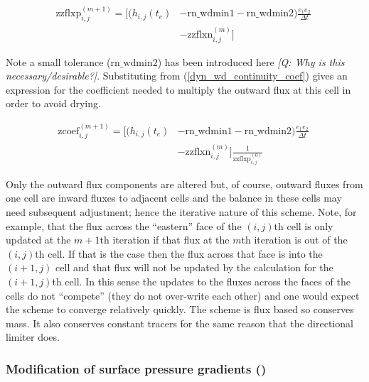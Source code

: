 \documentclass[../main/NEMO_manual]{subfiles}
\begin{document}
\begin{equation} \label{dyn_wd_max_flux}
\begin{split}
\mathrm{zzflxp}^{(m+1)}_{i,j} = \Big[ (h_{i,j}(t_e) & - \mathrm{rn\_wdmin1} - \mathrm{rn\_wdmin2})  \frac{e_1 e_2}{\Delta t} \phantom{]} \\
\phantom{[} & -  \mathrm{zzflxn}^{(m)}_{i,j} \Big]
\end{split}
\end{equation}

Note a small tolerance ($\mathrm{rn\_wdmin2}$) has been introduced here {\it [Q: Why is
this necessary/desirable?]}. Substituting from (\ref{dyn_wd_continuity_coef}) gives an
expression for the coefficient needed to multiply the outward flux at this cell in order
to avoid drying.

\begin{equation} \label{dyn_wd_continuity_nxtcoef}
\begin{split}
\mathrm{zcoef}^{(m+1)}_{i,j} = \Big[ (h_{i,j}(t_e) & - \mathrm{rn\_wdmin1} - \mathrm{rn\_wdmin2})  \frac{e_1 e_2}{\Delta t} \phantom{]} \\
\phantom{[} & -  \mathrm{zzflxn}^{(m)}_{i,j} \Big] \frac{1}{ \mathrm{zzflxp}^{(0)}_{i,j} } 
\end{split}
\end{equation}

Only the outward flux components are altered but, of course, outward fluxes from one cell
are inward fluxes to adjacent cells and the balance in these cells may need subsequent
adjustment; hence the iterative nature of this scheme.  Note, for example, that the flux
across the ``eastern'' face of the $(i,j)$th cell is only updated at the $m+1$th iteration
if that flux at the $m$th iteration is out of the $(i,j)$th cell. If that is the case then
the flux across that face is into the $(i+1,j)$ cell and that flux will not be updated by
the calculation for the $(i+1,j)$th cell. In this sense the updates to the fluxes across
the faces of the cells do not ``compete'' (they do not over-write each other) and one
would expect the scheme to converge relatively quickly. The scheme is flux based so
conserves mass. It also conserves constant tracers for the same reason that the
directional limiter does.


\subsubsection   [Modification of surface pressure gradients (\textit{dynhpg})]
         {Modification of surface pressure gradients ()}
\label{subsubsec:DYN_wd_il_spg}
\end{document}
